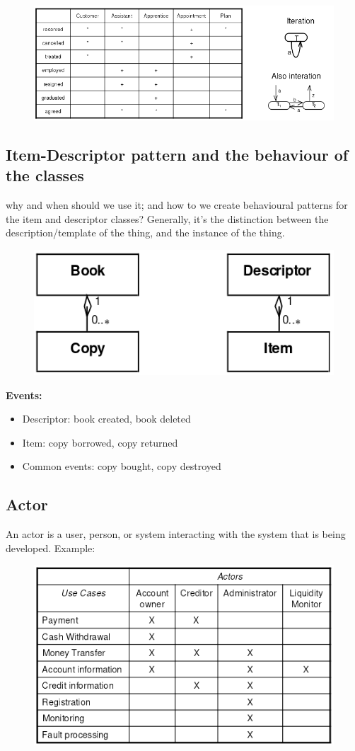 \begin{figure}[H]
    \centering
    \includegraphics[width=.8\textwidth]{figures/difficultiesiteration.png}
\end{figure}
 

\subsection{Item-Descriptor pattern and the behaviour of the classes} why and when should we use it; and how to we create behavioural patterns for the item and descriptor classes? Generally, it's the distinction between the description/template of the thing, and the instance of the thing.

\begin{figure}[H]
    \centering
    \includegraphics[width=.5\textwidth]{figures/difficultiesitemdescriptor.png}
\end{figure}

\textbf{Events:}
\begin{itemize}
    \item Descriptor: book created, book deleted
    \item Item: copy borrowed, copy returned
    \item Common events: copy bought, copy destroyed
\end{itemize}

\subsection{Actor}
An actor is a user, person, or system interacting with the system that is being developed. Example:

\begin{figure}[H]
    \centering
    \includegraphics[width=.5\textwidth]{figures/difficultiesactor.png}
\end{figure}

